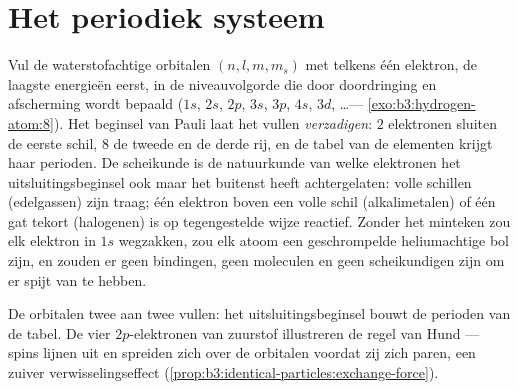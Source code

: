 \section{Het periodiek systeem}

\begin{proposition}\label{prop:b3:identical-particles:periodic}
Vul de waterstofachtige orbitalen $(n, l, m, m_s)$ met telkens één
elektron, de laagste energieën eerst, in de niveauvolgorde die door
doordringing en afscherming wordt bepaald ($1s$, $2s$, $2p$, $3s$, $3p$,
$4s$, $3d$, \dots --- \cref{exo:b3:hydrogen-atom:8}). Het beginsel van
Pauli laat het vullen \emph{verzadigen}: $2$ elektronen sluiten de eerste
schil, $8$ de tweede en de derde rij, en de tabel van de elementen krijgt
haar perioden. De scheikunde is de natuurkunde van welke elektronen het
uitsluitingsbeginsel ook maar het buitenst heeft achtergelaten: volle
schillen (edelgassen) zijn traag; één elektron boven een volle schil
(alkalimetalen) of één gat tekort (halogenen) is op tegengestelde wijze
reactief. Zonder het minteken zou elk elektron in $1s$ wegzakken, zou elk
atoom een geschrompelde heliumachtige bol zijn, en zouden er geen
bindingen, geen moleculen en geen scheikundigen zijn om er spijt van te
hebben.
\end{proposition}
\admitted

\begin{omfigure}

{\small De orbitalen twee aan twee vullen: het uitsluitingsbeginsel bouwt
de perioden van de tabel. De vier $2p$-elektronen van zuurstof
illustreren de regel van Hund --- spins lijnen uit en spreiden zich over
de orbitalen voordat zij zich paren, een zuiver verwisselingseffect
(\cref{prop:b3:identical-particles:exchange-force}).}
\end{omfigure}

